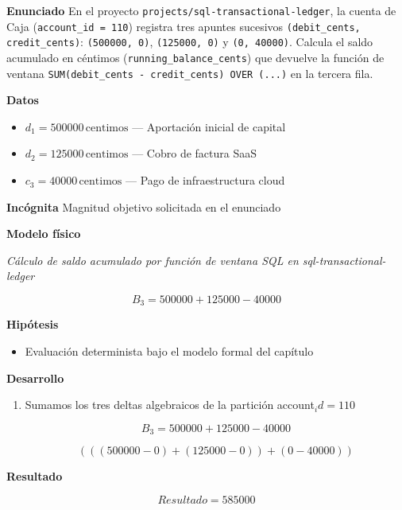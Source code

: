 \documentclass{book}
\begin{document}
\begin{tcolorbox}[title={Problema resuelto}, studiumworked, breakable]

\noindent\textbf{Enunciado}
En el proyecto \texttt{projects/sql-transactional-ledger}, la cuenta de Caja (\texttt{account\_id = 110}) registra tres apuntes sucesivos \texttt{(debit\_cents, credit\_cents)}: \texttt{(500000, 0)}, \texttt{(125000, 0)} y \texttt{(0, 40000)}. Calcula el saldo acumulado en céntimos (\texttt{running\_balance\_cents}) que devuelve la función de ventana \texttt{SUM(debit\_cents - credit\_cents) OVER (...)} en la tercera fila.

\noindent\textbf{Datos}
\begin{itemize}
\item $d_{1} = 500000\,\mathrm{centimos}$ — Aportación inicial de capital
\item $d_{2} = 125000\,\mathrm{centimos}$ — Cobro de factura SaaS
\item $c_{3} = 40000\,\mathrm{centimos}$ — Pago de infraestructura cloud
\end{itemize}

\noindent\textbf{Incógnita}
Magnitud objetivo solicitada en el enunciado

\noindent\textbf{Modelo físico}

\noindent\textit{Cálculo de saldo acumulado por función de ventana SQL en sql-transactional-ledger}

\[
B_3 = 500000 + 125000 - 40000
\]

\noindent\textbf{Hipótesis}
\begin{itemize}
\item Evaluación determinista bajo el modelo formal del capítulo
\end{itemize}

\noindent\textbf{Desarrollo}
\begin{enumerate}
\item
Sumamos los tres deltas algebraicos de la partición account\(_id = 110\)

\[
B_3 = 500000 + 125000 - 40000
\]

\[
\left(\left(\left(500000-0\right)+\left(125000-0\right)\right)+\left(0-40000\right)\right)
\]
\end{enumerate}

\noindent\textbf{Resultado}

\[
Resultado = 585000
\]


\end{tcolorbox}
\end{document}
